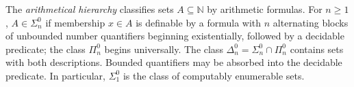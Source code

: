 
The \emph{arithmetical hierarchy} classifies sets $A\subseteq\mathbb N$ by arithmetic formulas. For $n\ge1$, $A\in\Sigma^0_n$ if membership $x\in A$ is definable by a formula with $n$ alternating blocks of unbounded number quantifiers beginning existentially, followed by a decidable predicate; the class $\Pi^0_n$ begins universally. The class $\Delta^0_n=\Sigma^0_n\cap\Pi^0_n$ contains sets with both descriptions. Bounded quantifiers may be absorbed into the decidable predicate. In particular, $\Sigma^0_1$ is the class of computably enumerable sets.
